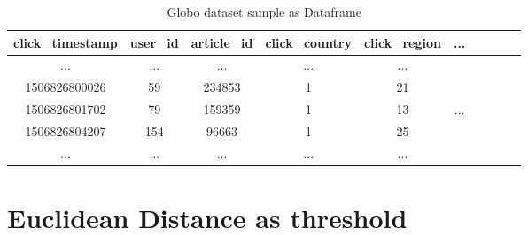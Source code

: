 \documentclass[ecp,tc,english]{iiufrgs}
\begin{document}
    \begin{table}[!ht]
        \centering
        \begin{tabular}{ |c|c|c|c|c|c|c|c|c|c| } 
            \hline
            click\_timestamp & user\_id & article\_id & click\_country & click\_region & ... \\
            \hline 
            ... & ...  & ...  & ...  & ... & \\
            1506826800026 & 59 & 234853 & 1 & 21 & \\ 
            1506826801702 & 79 & 159359 & 1 & 13 & ...\\ 
            1506826804207 & 154 & 96663 & 1 & 25 & \\ 
            ... & ...  & ...  & ...  & ... & \\
            \hline
        \end{tabular}
        \caption{Globo dataset sample as Dataframe}
        \label{tab:globo_dataset_sample}
    \end{table}

    \section{Euclidean Distance as threshold}
\end{document}
